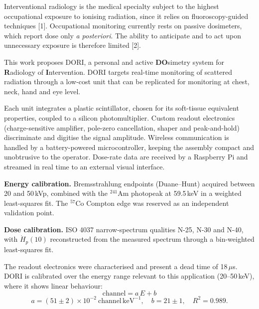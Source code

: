 %


Interventional radiology is the medical specialty subject to the highest
occupational exposure to ionising radiation, since it relies on
fluoroscopy-guided techniques [1]. Occupational monitoring currently rests on
passive dosimeters, which report dose only \emph{a posteriori}. The ability to
anticipate and to act upon unnecessary exposure is therefore limited [2].

This work proposes DORI, a personal and active \textbf{DO}simetry system for
\textbf{R}adiology of \textbf{I}ntervention. DORI targets real-time monitoring
of scattered radiation through a low-cost unit that can be replicated for
monitoring at chest, neck, hand and eye level.


Each unit integrates a plastic scintillator, chosen for its soft-tissue
equivalent properties, coupled to a silicon photomultiplier. Custom readout
electronics (charge-sensitive amplifier, pole-zero cancellation, shaper and
peak-and-hold) discriminate and digitise the signal amplitude. Wireless
communication is handled by a battery-powered microcontroller, keeping the
assembly compact and unobtrusive to the operator. Dose-rate data are received
by a Raspberry Pi and streamed in real time to an external visual interface.

\textbf{Energy calibration.} Bremsstrahlung endpoints (Duane--Hunt) acquired
between 20 and 50\,kVp, combined with the $^{241}$Am photopeak at 59.5\,keV in
a weighted least-squares fit. The $^{57}$Co Compton edge was reserved as an
independent validation point.

\textbf{Dose calibration.} ISO 4037 narrow-spectrum qualities N-25, N-30 and
N-40, with $\dot{H}_p(10)$ reconstructed from the measured spectrum through a
bin-weighted least-squares fit.


The readout electronics were characterised and present a dead time of
18\,$\mu$s. DORI is calibrated over the energy range relevant to this
application (20--50\,keV), where it shows linear behaviour:
\[
  \mathrm{channel} = a\,E + b
\]
\vspace{-8mm}
\[
  a = (51\pm2)\times10^{-2}~\mathrm{channel\,keV^{-1}},\quad
  b = 21\pm1,\quad R^2 = 0.989 .
\]



